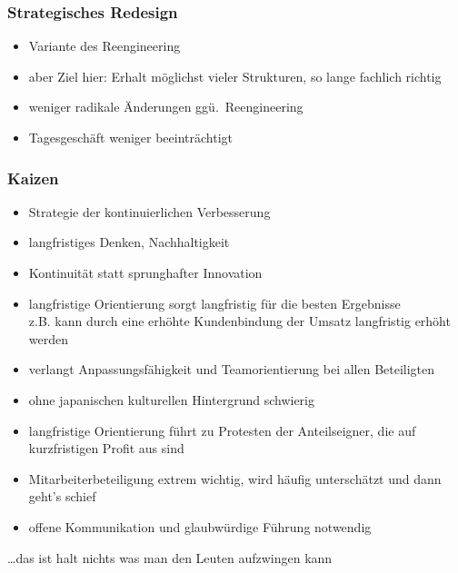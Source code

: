 \documentclass[a4paper, 12pt]{article}
\begin{document}
\subsubsection{Strategisches Redesign}
\begin{itemize}
  \item Variante des Reengineering
  \item aber Ziel hier: Erhalt möglichst vieler Strukturen, so lange fachlich richtig
\end{itemize}
\begin{itemize}
  \renewcommand{\labelitemi}{+}%
  \item weniger radikale Änderungen ggü.\ Reengineering
  \item Tagesgeschäft weniger beeinträchtigt
\end{itemize}

\subsubsection{Kaizen}
\begin{itemize}
  \item Strategie der kontinuierlichen Verbesserung
  \item langfristiges Denken, Nachhaltigkeit
  \item Kontinuität statt sprunghafter Innovation
\end{itemize}
\begin{itemize}
  \renewcommand{\labelitemi}{+}%
  \item langfristige Orientierung sorgt langfristig für die besten Ergebnisse\\
    z.B. kann durch eine erhöhte Kundenbindung der Umsatz langfristig erhöht werden
\end{itemize}
\begin{itemize}
  \renewcommand{\labelitemi}{\(-\)}%
  \item verlangt Anpassungsfähigkeit und Teamorientierung bei allen Beteiligten
  \item ohne japanischen kulturellen Hintergrund schwierig
  \item langfristige Orientierung führt zu Protesten der Anteilseigner, die auf kurzfristigen Profit aus sind
  \item Mitarbeiterbeteiligung extrem wichtig, wird häufig unterschätzt und dann geht's schief
  \item offene Kommunikation und glaubwürdige Führung notwendig
\end{itemize}
\ldots das ist halt nichts was man den Leuten aufzwingen kann
\end{document}
